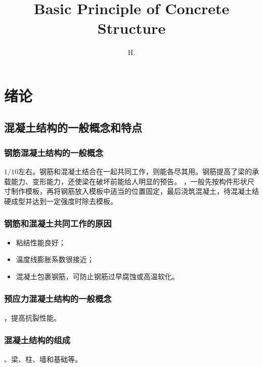 \documentclass{article}
\begin{document}
\title{Basic Principle of Concrete Structure}
\author{H.}
\maketitle
\newpage
\tableofcontents
\newpage
\section{绪论}
\subsection{混凝土结构的一般概念和特点}
\subsubsection{钢筋混凝土结构的一般概念}
$1/10$左右。钢筋和混凝土结合在一起共同工作，则能各尽其用。钢筋提高了梁的承载能力、变形能力，还使梁在破坏前能给人明显的预告。
，一般先按构件形状尺寸制作模板，再将钢筋放入模板中适当的位置固定，最后浇筑混凝土，待混凝土结硬成型并达到一定强度时除去模板。
\subsubsection{钢筋和混凝土共同工作的原因}
\begin{itemize}
    \item 粘结性能良好；
    \item 温度线膨胀系数很接近；
    \item 混凝土包裹钢筋，可防止钢筋过早腐蚀或高温软化。
\end{itemize}
\subsubsection{预应力混凝土结构的一般概念}
，提高抗裂性能。
\subsubsection{混凝土结构的组成}
、梁、柱、墙和基础等。
\end{document}
